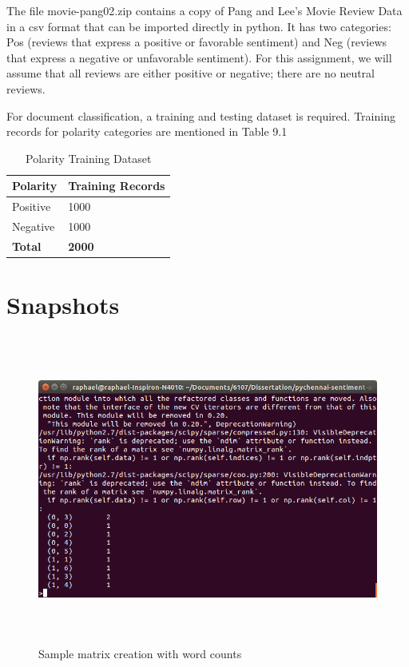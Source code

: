 \documentclass[oneside,a4paper,12pt]{pictreport}
\begin{document}
\par The file movie-pang02.zip contains a copy of Pang and Lee's Movie Review Data in a csv format that can be imported directly in python. It has two categories: Pos (reviews that express a positive or favorable sentiment) and Neg (reviews that express a negative or unfavorable sentiment). For this assignment, we will assume that all reviews are either positive or negative; there are no neutral reviews. 
\par For document classification, a training and testing dataset is required. Training records for polarity categories are mentioned in Table 9.1

\renewcommand{\arraystretch}{1.5}

\begin{table}[h!]
\centering
\caption{Polarity Training Dataset}
\label{my-label}
\begin{tabular}{|l|l|}
\hline
\textbf{Polarity} & \textbf{Training Records} \\ \hline
Positive          & 1000                      \\ \hline
Negative          & 1000                      \\ \hline

\textbf{Total}    & \textbf{2000}             \\ \hline
\end{tabular}
\end{table}


\section{Snapshots}


\begin{figure}[!h]
\includegraphics[width=6.0in,height=4.0in]{screenshot2.png}
\caption{Sample matrix creation with word counts}
\end{figure}
\end{document}
